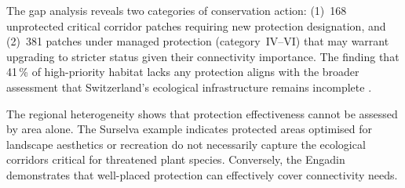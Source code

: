 The gap analysis reveals two categories of conservation action:
(1)~168 unprotected critical corridor patches requiring new
protection designation, and (2)~381 patches under managed
protection (category~IV--VI) that may warrant upgrading to
stricter status given their connectivity importance. The
finding that 41\,\% of high-priority habitat lacks any
protection aligns with the broader assessment that
Switzerland's ecological infrastructure remains incomplete
\citep{FOEN2025}.

The regional heterogeneity shows that protection
effectiveness cannot be assessed by area alone. The Surselva
example indicates protected areas optimised for landscape
aesthetics or recreation do not necessarily capture the
ecological corridors critical for threatened plant species.
Conversely, the Engadin demonstrates that well-placed
protection can effectively cover connectivity needs.
